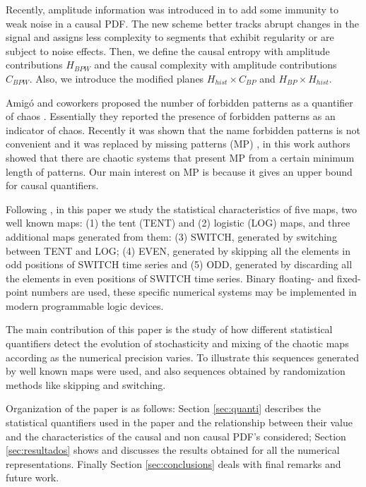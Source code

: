 Recently, amplitude information was introduced in \cite{Fadlallah2013} to add some immunity to weak noise in a causal PDF.
The new scheme better tracks abrupt changes in the signal and assigns less complexity to segments that exhibit regularity or are subject to noise effects.
Then, we define the causal entropy with amplitude contributions $H_{BPW}$ and the causal complexity with amplitude contributions $C_{BPW}$.
Also, we introduce the modified planes $H_{hist} \times C_{BP}$ and $H_{BP} \times H_{hist}$.

Amig\'o and coworkers proposed the number of forbidden patterns as a quantifier of chaos \cite{Amigo2007a}.
Essentially they reported the presence of forbidden patterns as an indicator of chaos.
Recently it was shown that the name forbidden patterns is not convenient and it was replaced by missing patterns (MP) \cite{Rosso2012}, in this work authors showed that there are chaotic systems that present MP from a certain minimum length of patterns.
Our main interest on MP is because it gives an upper bound for causal quantifiers.

Following \cite{Nagaraj2008}, in this paper we study the statistical characteristics of five maps, two well known maps: (1) the tent (TENT) and (2) logistic (LOG) maps, and three additional maps generated from them: (3) SWITCH, generated by switching between TENT and LOG; (4) EVEN, generated by skipping all the elements in odd positions of SWITCH time series and (5) ODD, generated by discarding all the elements in even positions of SWITCH time series.
Binary floating- and fixed-point numbers are used, these specific numerical systems may be implemented in modern programmable logic devices.

The main contribution of this paper is the study of how  different statistical quantifiers detect the evolution of stochasticity and mixing of the chaotic maps according as the numerical precision varies. 
To illustrate this sequences generated by well known maps were used, and also sequences obtained by randomization methods like skipping and switching.

Organization of the paper is as follows:
Section \ref{sec:quanti} describes the statistical quantifiers used in the paper and the relationship between their value and the characteristics of the causal and non causal PDF's considered;
Section \ref{sec:resultados} shows and discusses the results obtained for all the numerical representations.
Finally Section \ref{sec:conclusions} deals with final remarks and future work.